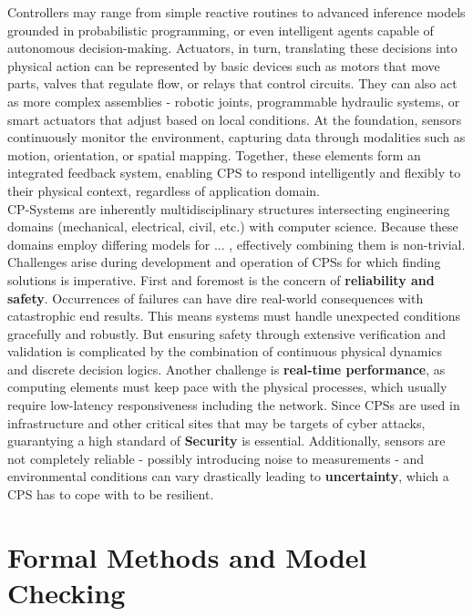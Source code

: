 Controllers may range from simple reactive routines to advanced inference models grounded in probabilistic programming, or even intelligent agents capable of autonomous
decision-making. Actuators, in turn, translating these decisions into physical action can be represented by basic devices such as motors that move parts,
valves that regulate flow, or relays that control circuits. They can also act as more complex assemblies - robotic joints, programmable hydraulic systems, or smart actuators
that adjust based on local conditions. At the foundation, sensors continuously monitor the environment, capturing data through modalities such as motion,
orientation, or spatial mapping. Together, these elements form  an integrated feedback system, enabling CPS to respond intelligently and flexibly to their physical context,
regardless of application domain.\\

CP-Systems are inherently multidisciplinary structures intersecting engineering domains (mechanical, electrical, civil, etc.) with computer science.
Because these domains employ differing models for ... , effectively combining them is non-trivial. Challenges arise during development and operation of CPSs for which
finding solutions is imperative. \cite{cpsChallengesAndFuture} First and foremost is the concern of \textbf{reliability and safety}. Occurrences of failures can have dire real-world
consequences with catastrophic end results. This means systems must handle unexpected conditions gracefully and robustly. But ensuring safety through extensive verification
and validation is complicated by the combination of continuous physical dynamics and discrete decision logics. Another challenge is \textbf{real-time performance}, as computing
elements must keep pace with the physical processes, which usually require low-latency responsiveness including the network. Since CPSs are used in infrastructure and other
critical sites that may be targets of cyber attacks, guarantying a high standard of \textbf{Security} is essential. Additionally, sensors are not completely reliable -
possibly introducing noise to measurements - and environmental conditions can vary drastically leading to \textbf{uncertainty}, which a CPS has to cope with to be resilient. \cite{cpsProbabilisticRobotics}

\label{sec:formal-methods}
\section{Formal Methods and Model Checking}

